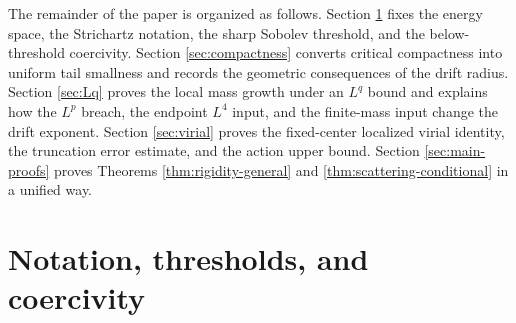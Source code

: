 \documentclass[smallextended,envcountsect,nospthms]{svjour3}
\numberwithin{equation}{section}
\theoremstyle{spbreak}
\theoremstyle{spdefbreak}
\theoremstyle{spdefbreak}
\begin{document}
The remainder of the paper is organized as follows. Section \ref{sec:notation} fixes the energy space, the Strichartz notation, the sharp Sobolev threshold, and the below-threshold coercivity. Section \ref{sec:compactness} converts critical compactness into uniform tail smallness and records the geometric consequences of the drift radius. Section \ref{sec:Lq} proves the local mass growth under an $L^q$ bound and explains how the $L^p$ breach, the endpoint $L^4$ input, and the finite-mass input change the drift exponent. Section \ref{sec:virial} proves the fixed-center localized virial identity, the truncation error estimate, and the action upper bound. Section \ref{sec:main-proofs} proves Theorems \ref{thm:rigidity-general} and \ref{thm:scattering-conditional} in a unified way.

\section{Notation, thresholds, and coercivity}\label{sec:notation}
\end{document}
